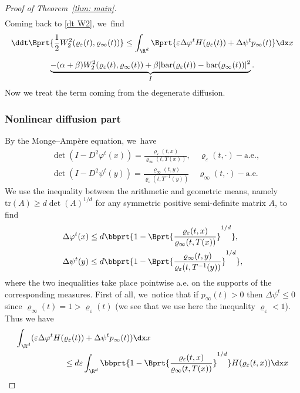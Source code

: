 \begin{proof}[Proof of Theorem~\ref{thm: main}]
\begin{multline*}
\end{multline*}
Coming back to \eqref{dt W2}, we~find
\begin{multline}\label{final_singular}
\ddt \Bprt{\frac 12 W_2^2(\varrho_\varepsilon(t), \varrho_\infty(t))}\leq \int_{\R^d} \Bprt{\varepsilon\Delta \varphi^t H(\varrho_\varepsilon(t)) +\Delta \psi^t p_\infty(t) }\dx x \\[5pt]
\underbrace{- (\alpha+\beta) W_2^2(\varrho_\varepsilon(t), \varrho_\infty(t)) + \beta |\mathrm{bar}(\varrho_\varepsilon(t))- \mathrm{bar}(\varrho_\infty(t))|^2}_{I}.
\end{multline}
Now we treat the term coming from the degenerate diffusion.

\subsubsection*{Nonlinear diffusion part}
By the Monge--Ampère equation, we~have
\begin{align*}
&\det (I - D^2 \varphi^t(x)) = \frac{\varrho_\varepsilon(t,x)}{\varrho_\infty(t,T (x))}, \quad \varrho_{\varepsilon}(t,\cdot)-\mathrm{a.e.},\\
&\det (I - D^2 \psi^t(y)) = \frac{\varrho_\infty(t,y)}{\varrho_\varepsilon(t,T^{-1}(y))} \quad \varrho_{\infty}(t,\cdot)-\mathrm{a.e.}
\end{align*}
We use the inequality between the arithmetic and geometric means, namely $\mathrm{tr} (A) \geq d \det (A)^{1/d}$ for any symmetric positive semi-definite matrix $A$, to find
\begin{align*}
&\Delta \varphi^t(x)\leq d\bbprt{1-\Bprt{\frac{\varrho_\varepsilon(t,x)}{\varrho_\infty(t,T(x))}}^{1/d}}, \\
&\Delta \psi^t(y)\leq d\bbprt{1-\Bprt{\frac{\varrho_\infty(t,y)}{\varrho_\varepsilon(t,T^{-1}(y))}}^{1/d}},
\end{align*}
where the two inequalities take place pointwise a.e. on the supports of the corresponding measures.
First of all, we~notice that if $p_\infty(t)>0$ then $\Delta \psi^t\le 0$ since $\varrho_\infty(t)=1> \varrho_\varepsilon(t)$ (we see that we use here the inequality $ \varrho_\varepsilon<1$). Thus we have
\begin{equation*}
\begin{split}
\int_{\R^d} (\varepsilon \Delta \varphi^t H(&\varrho_\varepsilon(t)) +\Delta \psi^t p_\infty(t) )\dx x
\\
&\leq d \varepsilon \int_{\R^d} \bbprt{1-\Bprt{\frac{\varrho_\varepsilon(t,x)}{\varrho_\infty(t,T(x))}}^{1/d}} H(\varrho_\varepsilon(t,x)) \dx x\\

\end{split}
\end{equation*}
\end{proof}
